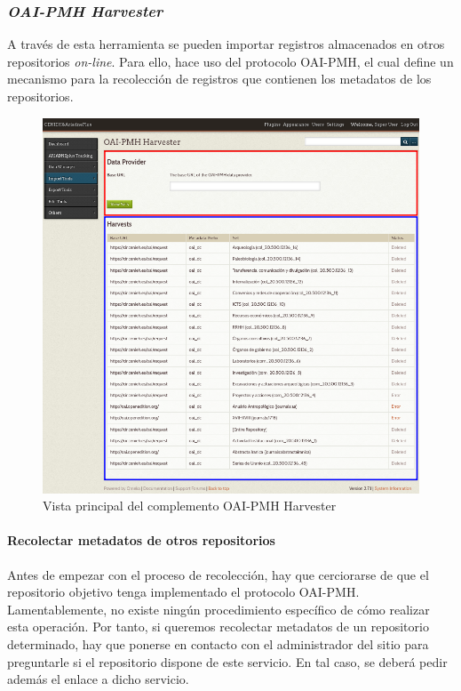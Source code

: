 \documentclass[
]{article}
\begin{document}
\hypertarget{oai-pmh-harvester}{%
\subsubsection{\texorpdfstring{\emph{OAI-PMH
Harvester}}{OAI-PMH Harvester}}\label{oai-pmh-harvester}}

A través de esta herramienta se pueden importar registros almacenados en
otros repositorios \emph{on-line}. Para ello, hace uso del protocolo
OAI-PMH, el cual define un mecanismo para la recolección de registros
que contienen los metadatos de los repositorios.

\begin{figure}
\hypertarget{oai-pmh-harvester-view-1}{%
\centering
\includegraphics{../_static/images/oai-pmh-harvester-view-1.png}
\caption{Vista principal del complemento OAI-PMH
Harvester}\label{oai-pmh-harvester-view-1}
}
\end{figure}

\hypertarget{recolectar-metadatos-de-otros-repositorios}{%
\paragraph{Recolectar metadatos de otros
repositorios}\label{recolectar-metadatos-de-otros-repositorios}}

Antes de empezar con el proceso de recolección, hay que cerciorarse de
que el repositorio objetivo tenga implementado el protocolo OAI-PMH.
Lamentablemente, no existe ningún procedimiento específico de cómo
realizar esta operación. Por tanto, si queremos recolectar metadatos de
un repositorio determinado, hay que ponerse en contacto con el
administrador del sitio para preguntarle si el repositorio dispone de
este servicio. En tal caso, se deberá pedir además el enlace a dicho
servicio.
\end{document}
